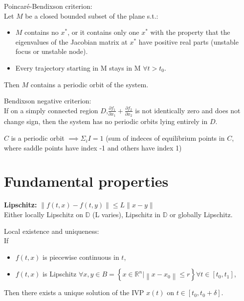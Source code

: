 \begin{tcolorbox}[colback=white, colframe=teal]
\begin{lemma}
    Poincaré-Bendixson criterion:\\
    Let $M$ be a closed bounded subset of the plane s.t.:
    \begin{itemize}[topsep=0pt]
        \item $M$ contains no $x^*$, or it
        contains only one $x^*$ with the property that
        the eigenvalues of the Jacobian matrix at $x^*$ have
        positive real parts (unstable focus or unstable node).
        \item Every trajectory starting in M stays in M $\forall t>t_0$.
    \end{itemize}
    Then $M$ contains a periodic orbit of the system.
\end{lemma}
\end{tcolorbox}

\begin{lemma}
    Bendixson negative criterion:\\
    If on a simply connected region $D$,$\frac{\partial f_{1}}{\partial x_{1}}+\frac{\partial f_{2}}{\partial x_{2}}$ is not identically zero and does not change sign, then the
    system has no periodic orbits lying entirely in $D$.
\end{lemma}

\begin{corollary}
    $C$ is a periodic orbit $\implies \Sigma_i I = 1$ (sum of indeces of equilibrium points in $C$, where saddle points have index -1 and others have index 1)
\end{corollary}

\section{Fundamental properties}
\textbf{Lipschitz:} $\|f(t, x)-f(t, y)\| \leq L\|x-y\|$ \\
Either locally Lipschitz on $\mathbb{D}$ (L varies), Lipschitz in $\mathbb{D}$ or globally Lipschitz.

\begin{theorem}
    Local existence and uniqueness:\\
    If
    \begin{itemize}[topsep=0pt]
        \item $f(t, x)$ is piecewise continuous in $t$,
        \item $f(t, x)$ is Lipschitz $\forall x, y \in B=\left\{x \in \mathbb{R}^{n} |\left\|x-x_{0}\right\| \leq r\right\} \forall t \in\left[t_{0}, t_{1}\right]$,
    \end{itemize}
    Then there exists a unique solution of the IVP $x(t)$
    on $t \in\left[t_{0}, t_{0}+\delta\right]$.
\end{theorem}

